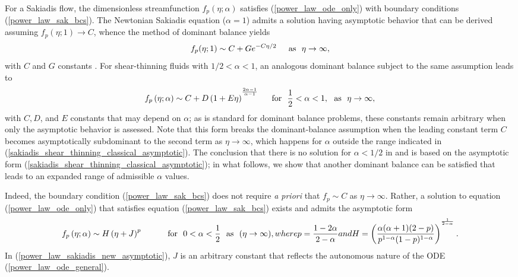 \documentclass{article}
\begin{document}
For a Sakiadis flow, the dimensionless streamfunction $f_p(\eta; \alpha)$ satisfies (\ref{power_law_ode_only}) with boundary conditions (\ref{power_law_sak_bcs}). The Newtonian Sakiadis equation ($\alpha=1$) admits a solution having asymptotic behavior that can be derived assuming $f_p(\eta; 1) \to C$, whence the method of dominant balance yields\begin{equation} f_p(\eta; 1) \sim C + Ge^{-C\eta/2} \hphantom{\sum} \text{as}~~ \eta \to \infty,\end{equation} with $C$ and $G$ constants \cite{GenMeth}. For shear-thinning fluids with $1/2 < \alpha < 1$, an analogous dominant balance subject to the same assumption leads to \begin{equation}
    f_p\left(\eta; \alpha\right) \sim C + D\left(1 + E\eta \right)^{^{\frac{2\alpha-1}{\alpha-1}}} \hphantom{\sum} \mathrm{for}~~ \frac{1}{2}<\alpha<1, ~~ \mathrm{as}~~\eta \to \infty, \label{sakiadis_shear_thinning_classical_asymptotic}
\end{equation} with $C, D$, and $E$ constants that may depend on $\alpha$; as is standard for dominant balance problems, these constants remain arbitrary when only the asymptotic behavior is assessed. Note that this form breaks the dominant-balance assumption when the leading constant term $C$ becomes asymptotically subdominant to the second term as $\eta \to \infty$, which happens for $\alpha$ outside the range indicated in (\ref{sakiadis_shear_thinning_classical_asymptotic}). The conclusion that there is no solution for $\alpha<1/2$ in \cite{Fox} and \cite{NonNewtonian} is based on the asymptotic form (\ref{sakiadis_shear_thinning_classical_asymptotic}); in what follows, we show that another dominant balance can be satisfied that leads to an expanded range of admissible $\alpha$ values.

Indeed, the boundary condition (\ref{power_law_sak_bcs}) does not require \textit{a priori} that $f_p \sim C$ as $\eta \to \infty$. Rather, a solution to equation (\ref{power_law_ode_only}) that satisfies equation (\ref{power_law_sak_bcs}) exists and admits the asymptotic form \begin{subequations} \begin{equation}
    f_p\left(\eta; \alpha \right) \sim H \left(\eta+J\right)^{p} \hphantom{\sum\sum} \mathrm{for}~~0 < \alpha < \dfrac{1}{2}~~ \mathrm{as}~~ (\eta \to \infty),
\end{equation} where \begin{equation} p = \dfrac{1-2\alpha}{2-\alpha} \end{equation}  and \begin{equation}
    H = \left(\dfrac{\alpha(\alpha+1)(2-p)}{p^{1-\alpha}(1-p)^{1-\alpha}}\right)^{^{\frac{1}{2-\alpha}}}.
\end{equation} \label{power_law_sakiadis_new_asymptotic} \end{subequations} \noindent In (\ref{power_law_sakiadis_new_asymptotic}), $J$ is an arbitrary constant that reflects the autonomous nature of the ODE (\ref{power_law_ode_general}). 
\end{document}
